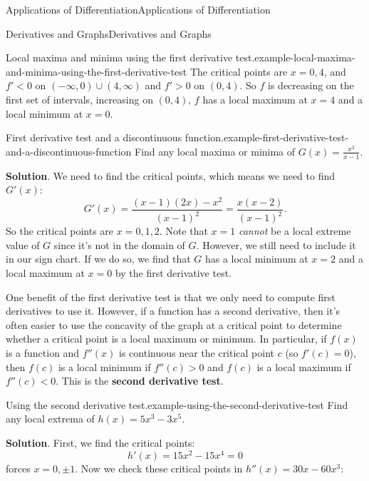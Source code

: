 \documentclass[10pt,]{book}
\newcommand{\terminology}[1]{\textbf{#1}}
\numberwithin{equation}{section}
\begin{document}
\begin{chapterptx}{Applications of Differentiation}{}{Applications of Differentiation}{}{}
\begin{sectionptx}{Derivatives and Graphs}{}{Derivatives and Graphs}{}{}
\begin{example}{Local maxima and minima using the first derivative test.}{example-local-maxima-and-minima-using-the-first-derivative-test}
The critical points are \(x=0,4\), and \(f' < 0\) on \((-\infty,0)\cup(4,\infty)\) and \(f' > 0\) on \((0,4)\). So \(f\) is decreasing on the first set of intervals, increasing on \((0,4)\), \(f\) has a local maximum at \(x=4\) and a local minimum at \(x=0\).%
\end{example}
\begin{example}{First derivative test and a discontinuous function.}{example-first-derivative-test-and-a-discontinuous-function}%
\hypertarget{p-349}{}%
Find any local maxima or minima of \(G(x) = \frac{x^{2}}{x-1}\).%
\par\smallskip%
\noindent\textbf{Solution}.\hypertarget{solution-76}{}\quad%
\hypertarget{p-350}{}%
We need to find the critical points, which means we need to find \(G'(x)\):%
\begin{equation*}
G'(x) = \frac{(x-1)(2x) - x^{2}}{(x-1)^{2}} = \frac{x(x-2)}{(x-1)^{2}}.
\end{equation*}
So the critical points are \(x=0,1,2\). Note that \(x=1\) \emph{cannot} be a local extreme value of \(G\) since it's not in the domain of \(G\). However, we still need to include it in our sign chart. If we do so, we find that \(G\) has a local minimum at \(x=2\) and a local maximum at \(x=0\) by the first derivative test.%
\end{example}
\hypertarget{p-351}{}%
One benefit of the first derivative test is that we only need to compute first derivatives to use it. However, if a function has a second derivative, then it's often easier to use the concavity of the graph at a critical point to determine whether a critical point is a local maximum or minimum. In particular, if \(f(x)\) is a function and \(f''(x)\) is continuous near the critical point \(c\) (so \(f'(c) = 0\)), then \(f(c)\) is a local minimum if \(f''(c) > 0\) and \(f(c)\) is a local maximum if \(f''(c) < 0\). This is the \terminology{second derivative test}.%
\begin{example}{Using the second derivative test.}{example-using-the-second-derivative-test}%
\hypertarget{p-352}{}%
Find any local extrema of \(h(x) = 5x^{3} - 3x^{5}\).%
\par\smallskip%
\noindent\textbf{Solution}.\hypertarget{solution-77}{}\quad%
\hypertarget{p-353}{}%
First, we find the critical points:%
\begin{equation*}
h'(x) = 15x^{2} - 15x^{4} = 0
\end{equation*}
forces \(x=0,\pm1\). Now we check these critical points in \(h''(x) = 30x - 60x^{3}:\)%
\begin{align*}

\end{align*}
\end{example}
\end{sectionptx}
\end{chapterptx}
\end{document}
